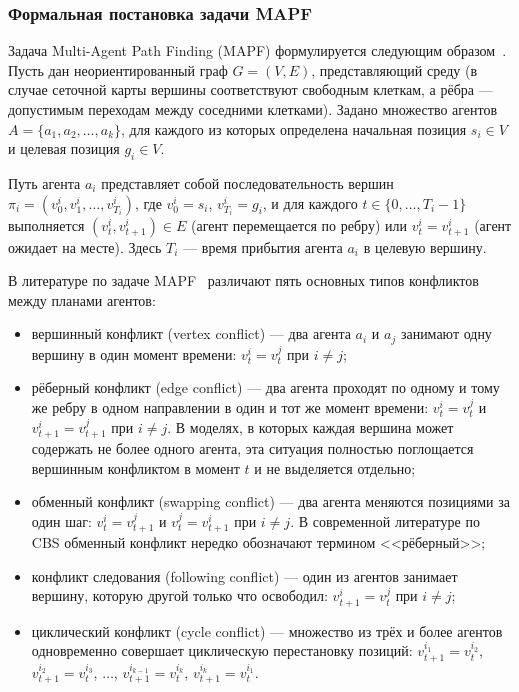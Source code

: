 \subsubsection{Формальная постановка задачи MAPF}

Задача Multi-Agent Path Finding (MAPF) формулируется следующим образом~\cite{stern2019mapf}. Пусть дан неориентированный граф $G = (V, E)$, представляющий среду (в случае сеточной карты вершины соответствуют свободным клеткам, а рёбра --- допустимым переходам между соседними клетками). Задано множество агентов $A = \{a_1, a_2, \ldots, a_k\}$, для каждого из которых определена начальная позиция $s_i \in V$ и целевая позиция $g_i \in V$.

Путь агента $a_i$ представляет собой последовательность вершин $\pi_i = (v_0^i, v_1^i, \ldots, v_{T_i}^i)$, где $v_0^i = s_i$, $v_{T_i}^i = g_i$, и для каждого $t \in \{0, \ldots, T_i - 1\}$ выполняется $(v_t^i, v_{t+1}^i) \in E$ (агент перемещается по ребру) или $v_t^i = v_{t+1}^i$ (агент ожидает на месте). Здесь $T_i$ --- время прибытия агента $a_i$ в целевую вершину.

В литературе по задаче MAPF~\cite{stern2019mapf} различают пять основных типов конфликтов между планами агентов:

\begin{itemize}
    \item вершинный конфликт (vertex conflict) --- два агента $a_i$ и $a_j$ занимают одну вершину в один момент времени: $v_t^i = v_t^j$ при $i \neq j$;
    \item рёберный конфликт (edge conflict) --- два агента проходят по одному и тому же ребру в одном направлении в один и тот же момент времени: $v_t^i = v_t^j$ и $v_{t+1}^i = v_{t+1}^j$ при $i \neq j$. В моделях, в которых каждая вершина может содержать не более одного агента, эта ситуация полностью поглощается вершинным конфликтом в момент $t$ и не выделяется отдельно;
    \item обменный конфликт (swapping conflict) --- два агента меняются позициями за один шаг: $v_t^i = v_{t+1}^j$ и $v_t^j = v_{t+1}^i$ при $i \neq j$. В современной литературе по CBS обменный конфликт нередко обозначают термином <<рёберный>>;
    \item конфликт следования (following conflict) --- один из агентов занимает вершину, которую другой только что освободил: $v_{t+1}^i = v_t^j$ при $i \neq j$;
    \item циклический конфликт (cycle conflict) --- множество из трёх и более агентов одновременно совершает циклическую перестановку позиций: $v_{t+1}^{i_1} = v_t^{i_2}$, $v_{t+1}^{i_2} = v_t^{i_3}$, $\ldots$, $v_{t+1}^{i_{k-1}} = v_t^{i_k}$, $v_{t+1}^{i_k} = v_t^{i_1}$.
\end{itemize}

